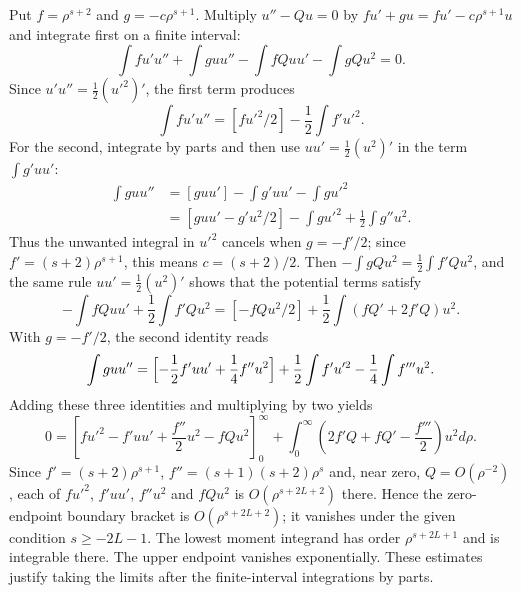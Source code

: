 Put $f=\rho^{s+2}$ and $g=-c\rho^{s+1}$.  Multiply $u''-Qu=0$ by
$fu'+gu=fu'-c\rho^{s+1}u$ and integrate first on a finite interval:
\[
\int fu'u''+\int guu''-\int fQuu'-\int gQu^2=0.
\]
Since $u'u''=\frac12(u'^2)'$, the first term produces
\[
\int fu'u''=[fu'^2/2]-\frac12\int f'u'^2.
\]
For the second, integrate by parts and then use
$uu'=\frac12(u^2)'$ in the term $\int g'uu'$:
\begin{align*}
\int guu''&=[guu']-\int g'uu'-\int gu'^2\\
 &=[guu'-g'u^2/2]-\int gu'^2+\frac12\int g''u^2.
\end{align*}
Thus the unwanted integral in $u'^2$ cancels when
$g=-f'/2$; since $f'=(s+2)\rho^{s+1}$, this means $\boxed{c=(s+2)/2}$.
Then $-\int gQu^2=\frac12\int f'Qu^2$, and the same rule
$uu'=\frac12(u^2)'$ shows that the potential terms satisfy
\[
-\int fQuu'+\frac12\int f'Qu^2
 =[-fQu^2/2]+\frac12\int(fQ'+2f'Q)u^2.
\]
With $g=-f'/2$, the second identity reads
\[
\int guu''=\Bigl[-\frac12f'uu'+\frac14f''u^2\Bigr]
 +\frac12\int f'u'^2-\frac14\int f'''u^2.
\]
Adding these three identities and multiplying by two yields
\[
0=\left[fu'^2-f'uu'+\frac{f''}2u^2-fQu^2\right]_0^\infty
 +\int_0^\infty\left(2f'Q+fQ'-\frac{f'''}2\right)u^2d\rho.
\]
Since $f'=(s+2)\rho^{s+1}$, $f''=(s+1)(s+2)\rho^s$ and, near zero,
$Q=O(\rho^{-2})$, each of $fu'^2$, $f'uu'$, $f''u^2$ and $fQu^2$ is
$O(\rho^{s+2L+2})$ there.  Hence the zero-endpoint boundary bracket is
$O(\rho^{s+2L+2})$; it vanishes under the given condition $s\ge-2L-1$.
The lowest moment integrand has order $\rho^{s+2L+1}$ and is
integrable there.  The upper endpoint vanishes exponentially.
These estimates justify taking the limits after the finite-interval
integrations by parts.

